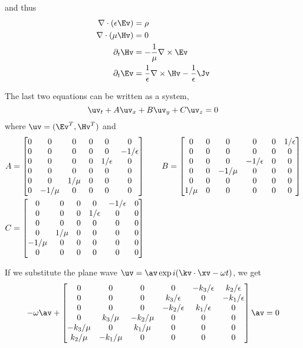 \documentclass[10pt]{article}
\newcommand{\grad}{\nabla}
\begin{document}
and thus
\begin{align}
  \grad\cdot(\eps\Ev) &=\rho \\
  \grad\cdot(\mu\Hv) &= 0 \\
  \partial_t \Hv &= - {1\over \mu} \grad\times\Ev \\
  \partial_t \Ev &=  {1\over \eps} \grad\times\Hv - {1\over \eps}\Jv 
\end{align}

The last two equations can be written as a system,
\[
   \uv_t + A \uv_x + B \uv_y + C \uv_z = 0
\]
where $\uv=(\Ev^T,\Hv^T)$ and
\begin{align*}
   A &= \begin{bmatrix} 
          0 & 0 & 0 & 0 & 0 & 0\\
          0 & 0 & 0 & 0 & 0 & -1/\epsilon\\
          0 & 0 & 0 & 0 & 1/\epsilon & 0\\
          0 & 0 & 0 & 0 & 0 & 0\\
          0 & 0 & 1/\mu & 0 & 0 & 0\\
          0 & -1/\mu & 0 & 0 & 0 & 0
       \end{bmatrix} \qquad
   B = \begin{bmatrix} 
          0 & 0 & 0 & 0 & 0 & 1/\epsilon\\
          0 & 0 & 0 & 0 & 0 & 0\\
          0 & 0 & 0 & -1/\epsilon & 0 & 0\\
          0 & 0 & -1/\mu & 0 & 0 & 0\\
          0 & 0 & 0 & 0 & 0 & 0\\
          1/\mu & 0 & 0 & 0 & 0 & 0
       \end{bmatrix} \\
   C &= \begin{bmatrix} 
          0 & 0 & 0 & 0 &-1/\epsilon & 0\\
          0 & 0 & 0 & 1/\epsilon & 0 & 0\\
          0 & 0 & 0 & 0 & 0 & 0\\
          0 & 1/\mu & 0 & 0 & 0 & 0\\
          -1/\mu & 0 & 0 & 0 & 0 & 0\\
          0 & 0 & 0 & 0 & 0 & 0
       \end{bmatrix}
\end{align*}

If we substitute the plane wave $\uv = \av\exp{i (\kv\cdot\xv - \omega t)}$,
we get
\[
   -\omega \av + 
            \begin{bmatrix}
          0 & 0 & 0 & 0 & -k_3/\eps & k_2/\eps\\
          0 & 0 & 0 & k_3/\eps & 0 & -k_1/\eps\\
          0 & 0 & 0 & -k_2/\eps & k_1/\eps & 0\\
          0 & k_3/\mu & -k_2/\mu & 0 & 0 & 0\\
         -k_3/\mu & 0 & k_1/\mu & 0 & 0 & 0\\
          k_2/\mu & -k_1/\mu & 0 & 0 & 0 & 0
            \end{bmatrix} 
     \av = 0
\]
\end{document}
